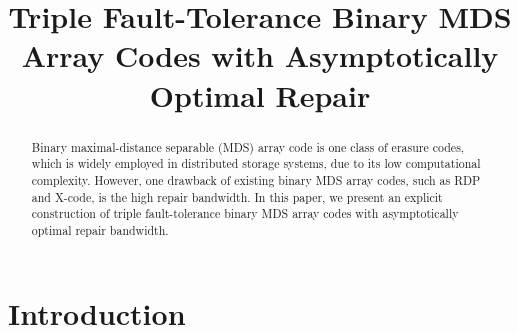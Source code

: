 \documentclass[conference]{IEEEtran}
\title{Triple Fault-Tolerance Binary MDS Array Codes with Asymptotically Optimal Repair}
\begin{document}
\maketitle
\begin{abstract}
Binary maximal-distance separable (MDS) array code is one class of erasure codes, which is widely employed in distributed storage systems, due to its low computational complexity.
However, one drawback of existing binary MDS array codes, such as RDP and X-code, is the high repair bandwidth.
In this paper, we present an explicit construction of triple fault-tolerance binary MDS array codes with asymptotically optimal repair bandwidth.

\end{abstract}




\section{Introduction}
\end{document}
